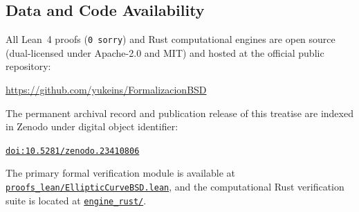 \documentclass[11pt,reqno]{article}
\theoremstyle{plain}
\theoremstyle{definition}
\begin{document}
\subsection*{Data and Code Availability}
All Lean~4 proofs (\texttt{0 sorry}) and Rust computational engines are open source (dual-licensed under Apache-2.0 and MIT) and hosted at the official public repository:
\begin{center}
\url{https://github.com/yukeins/FormalizacionBSD}
\end{center}
The permanent archival record and publication release of this treatise are indexed in Zenodo under digital object identifier:
\begin{center}
\href{https://doi.org/10.5281/zenodo.23410806}{\texttt{doi:10.5281/zenodo.23410806}}
\end{center}
The primary formal verification module is available at \href{https://github.com/yukeins/FormalizacionBSD/blob/main/proofs_lean/EllipticCurveBSD.lean}{\texttt{proofs\_lean/EllipticCurveBSD.lean}}, and the computational Rust verification suite is located at \href{https://github.com/yukeins/FormalizacionBSD/tree/main/engine_rust}{\texttt{engine\_rust/}}.
\end{document}
